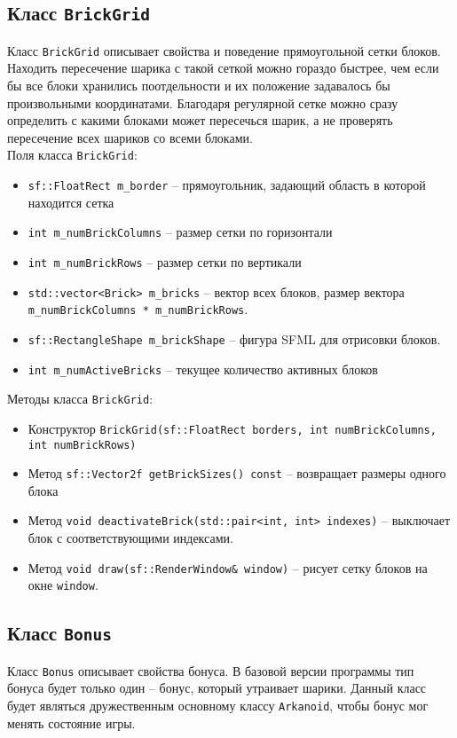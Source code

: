 \documentclass{article}
\begin{document}
\subsection*{Класс \texttt{BrickGrid}}
Класс \texttt{BrickGrid} описывает свойства и поведение прямоугольной сетки блоков. Находить пересечение шарика с такой сеткой можно гораздо быстрее, чем если бы все блоки хранились поотдельности и их положение задавалось бы произвольными координатами. Благодаря регулярной сетке можно сразу определить с какими блоками может пересечься шарик, а не проверять пересечение всех шариков со всеми блоками.\\

Поля класса \texttt{BrickGrid}:
\begin{itemize}
\item \texttt{sf::FloatRect m\_border} -- прямоугольник, задающий область в которой находится сетка
\item \texttt{int m\_numBrickColumns} -- размер сетки по горизонтали
\item \texttt{int m\_numBrickRows} -- размер сетки по вертикали
\item \texttt{std::vector<Brick> m\_bricks} -- вектор всех блоков, размер вектора \texttt{m\_numBrickColumns * m\_numBrickRows}.
\item \texttt{sf::RectangleShape m\_brickShape} -- фигура SFML для отрисовки блоков.
\item \texttt{int m\_numActiveBricks} -- текущее количество активных блоков
\end{itemize}

Методы класса \texttt{BrickGrid}:
\begin{itemize}
\item Конструктор \texttt{BrickGrid(sf::FloatRect borders, int numBrickColumns, int numBrickRows)}
\item Метод \texttt{sf::Vector2f getBrickSizes() const} -- возвращает размеры одного блока
\item Метод \texttt{void deactivateBrick(std::pair<int, int> indexes)} -- выключает блок с соответствующими индексами.
\item Метод \texttt{void draw(sf::RenderWindow\& window)} -- рисует сетку блоков на окне \texttt{window}.
\end{itemize}

\subsection*{Класс \texttt{Bonus}}
Класс \texttt{Bonus} описывает свойства бонуса. В базовой версии программы тип бонуса будет только один -- бонус, который утраивает шарики. Данный класс будет являться дружественным основному классу \texttt{Arkanoid}, чтобы бонус мог менять состояние игры.\\
\end{document}
